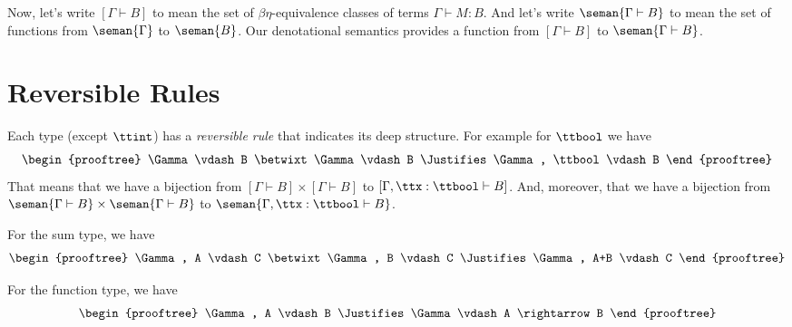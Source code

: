 \documentclass[runningheads,12pt]{llncs}
\begin{document}
Now, let's write $[\Gamma \vdash B]$ to mean the set of $\beta\eta$-equivalence classes of terms $\Gamma \vdash M : B$.   And let's write $\seman{\Gamma \vdash B}$ to mean the set of functions from $\seman{\Gamma}$ to $\seman{B}$.  Our denotational semantics provides a function from $[\Gamma \vdash B]$ to $\seman{\Gamma \vdash B}$.

\section{Reversible Rules}

Each type (except $\ttint$) has a \emph{reversible rule} that indicates its deep structure.  For example for $\ttbool$ we have
\begin{displaymath}
  \begin{prooftree}
    \Gamma \vdash B \betwixt \Gamma \vdash B
    \Justifies
    \Gamma, \ttbool \vdash B
  \end{prooftree}
\end{displaymath}
That means that we have a bijection from $[\Gamma \vdash B] \times [ \Gamma \vdash B]$ to $[\Gamma, \ttx:\ttbool \vdash B]$.  And, moreover, that we have a bijection from $\seman{\Gamma \vdash B} \times \seman{\Gamma \vdash B}$ to $\seman{\Gamma, \ttx:\ttbool \vdash B}$.

For the sum type, we have
\begin{displaymath}
  \begin{prooftree}
    \Gamma, A \vdash C \betwixt \Gamma, B \vdash C
    \Justifies
    \Gamma, A+B \vdash C
  \end{prooftree}
\end{displaymath}

For the function type, we have
\begin{displaymath}
  \begin{prooftree}
    \Gamma, A \vdash B
    \Justifies
    \Gamma \vdash A \rightarrow B
  \end{prooftree}
\end{displaymath}
\end{document}
